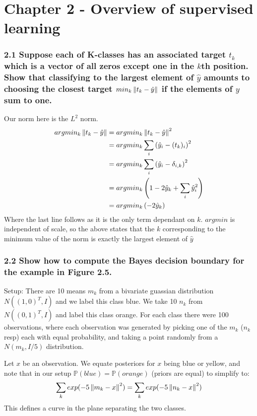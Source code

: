 
\chapter{Chapter 2 - Overview of supervised learning}






\subsection*{2.1 Suppose each of K-classes has an associated target $t_k$ which is a vector of all zeros except one in the $k$th position. Show that classifying to the largest element of $\hat{y}$ amounts to choosing the closest target $min_k \left\lVert t_k - \hat{y}\right\rVert$ if the elements of $y$ sum to one.}

Our norm here is the $L^2$ norm. 
\begin{align*}
    argmin_k \left\lVert t_k - \hat{y}\right\rVert &=  argmin_k \left\lVert t_k - \hat{y}\right\rVert^2 \\
    &= argmin_k \sum_i \left(\hat{y}_i - (t_k)_i\right)^2 \\
    &= argmin_k \sum_i \left(\hat{y}_i - \delta_{i, k}\right)^2 \\
    &= argmin_k \left( 1 - 2 \hat{y}_k + \sum_i  \hat{y}_i^2\right)  \\
    &= argmin_k \left(-2\hat{y}_k\right)
\end{align*}
Where the last line follows as it is the only term dependant on $k$. $argmin$ is independent of scale, so the above states that the $k$ corresponding to the minimum value of the norm is exactly the largest element of $\hat{y}$







\subsection*{2.2 Show how to compute the Bayes decision boundary for the example in Figure 2.5.}
Setup: There are 10 means $m_k$ from a bivariate guassian distribution $N((1,0)^T, I)$ and we label this class blue.
We take 10 $n_k$ from $N((0,1)^T, I)$ and label this class orange.
For each class there were 100 observations, where each observation was generated by picking one of the $m_k$ ($n_k$ resp) each with equal probability, and taking a point randomly from a $N(m_k, I/5)$ distribution.

Let $x$ be an observation. We equate posteriors for $x$ being blue or yellow, and note that in our setup $\mathbb{P}(blue) = \mathbb{P}(orange)$ (priors are equal) to simplify to:
$$\sum_k exp(-5 \left\lVert m_k - x\right\rVert^2) = \sum_k exp(-5 \left\lVert n_k - x\right\rVert^2)$$
This defines a curve in the plane separating the two classes.






